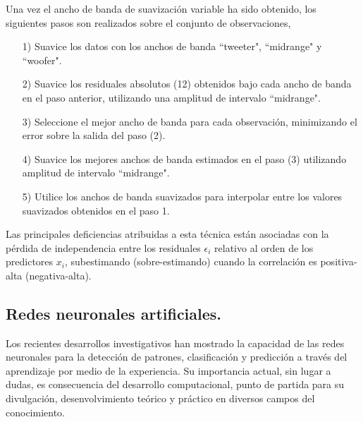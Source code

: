 \hspace*{0.4 cm} Una vez el ancho de banda de suavizaci\'on variable ha sido obtenido, los siguientes pasos son realizados sobre el conjunto de observaciones,

\begin{itemize}
  \item[1)] Suavice los datos con los anchos de banda ``tweeter"\hspace*{0.01 cm}, ``midrange"\hspace*{0.01 cm} y ``woofer"\hspace*{0.01 cm}.
  \item[2)] Suavice los residuales absolutos (12) obtenidos bajo cada ancho de banda en el paso anterior, utilizando una amplitud de intervalo ``midrange"\hspace*{0.01 cm}.
  \item[3)] Seleccione el mejor ancho de banda para cada observaci\'on, minimizando el error sobre la salida del paso (2).
  \item[4)] Suavice los mejores anchos de banda estimados en el paso (3) utilizando amplitud de intervalo ``midrange"\hspace*{0.01 cm}.
  \item[5)] Utilice los anchos de banda suavizados para interpolar entre los valores suavizados obtenidos en el paso 1.
\end{itemize}


\hspace*{0.4 cm} Las principales deficiencias atribuidas a esta t\'ecnica est\'an asociadas con la p\'erdida de independencia entre los residuales $\epsilon_{i}$ relativo al orden de los predictores $x_{i}$, subestimando (sobre-estimando) cuando la correlaci\'on es positiva-alta (negativa-alta).

\subsection{Redes neuronales artificiales.\\}


\hspace*{0.4 cm} Los recientes desarrollos investigativos han mostrado la capacidad de las redes neuronales para la detecci\'on de patrones, clasificaci\'on y predicci\'on a trav\'es del aprendizaje por medio de la experiencia. Su importancia actual, sin lugar a dudas, es consecuencia del desarrollo computacional, punto de partida para su divulgaci\'on, desenvolvimiento te\'orico y pr\'actico en diversos campos del conocimiento.

